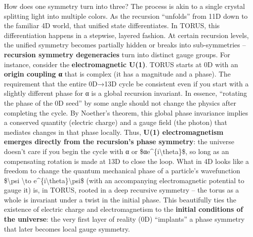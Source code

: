 \documentclass[
]{article}
\begin{document}
How does one symmetry turn into three? The process is akin to a single
crystal splitting light into multiple colors. As the recursion
``unfolds'' from 11D down to the familiar 4D world, that unified state
differentiates. In TORUS, this differentiation happens in a stepwise,
layered fashion. At certain recursion levels, the unified symmetry
becomes partially hidden or breaks into sub-symmetries --
\textbf{recursion symmetry degeneracies} turn into distinct gauge
groups. For instance, consider the \textbf{electromagnetic U(1)}. TORUS
starts at 0D with an \textbf{origin coupling α} that is complex (it has
a magnitude and a phase). The requirement that the entire 0D→13D cycle
be consistent even if you start with a slightly different phase for α is
a global recursion invariant. In essence, ``rotating the phase of the 0D
seed'' by some angle should not change the physics after completing the
cycle\hspace{0pt}. By Noether's theorem, this global phase invariance
implies a conserved quantity (electric charge) and a gauge field (the
photon) that mediates changes in that phase locally. Thus, \textbf{U(1)
electromagnetism emerges directly from the recursion's phase symmetry}:
the universe doesn't care if you begin the cycle with α or
\$αe\^{}\{i\textbackslash theta\}\$, so long as an compensating rotation
is made at 13D to close the loop\hspace{0pt}. What in 4D looks like a
freedom to change the quantum mechanical phase of a particle's
wavefunction \$\textbackslash psi \textbackslash to
e\^{}\{i\textbackslash theta\}\textbackslash psi\$ (with an accompanying
electromagnetic potential to gauge it) is, in TORUS, rooted in a deep
recursive symmetry -- the torus as a whole is invariant under a twist in
the initial phase. This beautifully ties the existence of electric
charge and electromagnetism to the \textbf{initial conditions of the
universe}: the very first layer of reality (0D) ``implants'' a phase
symmetry that later becomes local gauge symmetry.
\end{document}
